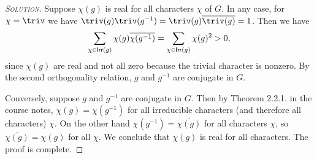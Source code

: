\begin{proof}[{\scshape Solution}]
Suppose $\chi(g)$ is real for all characters $\chi$ of $G$. In any case, for $\chi = \triv$ we have $\triv(g)\triv(g^{-1}) = \triv(g)\overline{\triv(g)} = 1$. Then we have
\[
\sum_{\chi \in \mathsf{Irr}(g)}\chi(g)\overline{\chi(g^{-1})} = \sum_{\chi \in \mathsf{Irr}(g)}\chi(g)^2 > 0,
\]
since $\chi(g)$ are real and not all zero because the trivial character is nonzero. By the second orthogonality relation, $g$ and $g^{-1}$ are conjugate in $G$.

Conversely, suppose $g$ and $g^{-1}$ are conjugate in $G$. Then by Theorem 2.2.1. in the course notes, $\chi(g) = \chi(g^{-1})$ for all irreducible characters (and therefore all characters) $\chi$. On the other hand $\chi(g^{-1}) = \overline{\chi(g)}$ for all characters $\chi$, so $\overline{\chi(g)} = \chi(g)$ for all $\chi$. We conclude that $\chi(g)$ is real for all characters. The proof is complete.
\end{proof}


